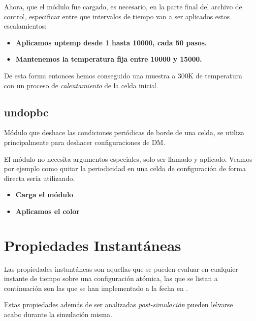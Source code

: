 Ahora, que el m\'odulo fue cargado, es necesario, en la parte final del archivo de control, especificar entre que intervalos de tiempo van a ser aplicados estos escalamientos:

\begin{itemize}
 \item \textbf{Aplicamos \textbf{uptemp} desde 1 hasta 10000, cada 50 pasos.}
 \item \textbf{Mantenemos la temperatura fija entre 10000 y 15000.}
\end{itemize}

De esta forma entonces hemos conseguido una muestra a 300K de temperatura con un proceso de \textit{calentamiento} de la celda inicial.

\subsection{undopbc}
M\'odulo que deshace las condiciones peri\'odicas de borde de una celda, se utiliza principalmente para deshacer configuraciones de DM.

El m\'odulo no necesita argumentos especiales, solo ser llamado y aplicado. Veamos por ejemplo como quitar la periodicidad en una celda de configuraci\'on de forma directa ser\'ia utilizando.

\begin{itemize}
 \item \textbf{Carga el m\'odulo}
 \item \textbf{Aplicamos el color}
\end{itemize}


\section{Propiedades Instant\'aneas}
Las propiedades instant\'aneas son aquellas que se pueden evaluar en cualquier instante de tiempo sobre una configuraci\'on at\'omica, las que se listan a continuaci\'on son las que se han implementado a la fecha en {\lpmd}.

Estas propiedades adem\'as de ser analizadas \textit{post-simulaci\'on} pueden lelvarse acabo durante la simulaci\'on misma.

